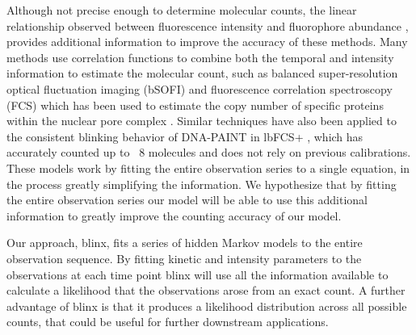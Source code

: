 Although not precise enough to determine molecular counts, the linear
relationship observed between fluorescence intensity and fluorophore abundance
\cite{schmied_fluorescence_2012}, provides additional information to improve the
accuracy of these methods.
%
  Many methods use correlation functions to combine both the temporal and
  intensity information to estimate the molecular count, such as balanced
  super-resolution optical fluctuation imaging (bSOFI) and fluorescence
  correlation spectroscopy (FCS) which has been used to estimate the copy
  number of specific proteins within the nuclear pore complex
  \cite{otsuka_quantitative_2023}. Similar techniques have also been applied to the
  consistent blinking behavior of DNA-PAINT in lbFCS+ \cite{stein_calibration-free_2021}, which has
  accurately counted up to ~8 molecules and does not rely on previous
  calibrations. These models work by fitting the entire observation series to a
  single equation, in the process greatly simplifying the information. We
  hypothesize that by fitting the entire observation series our model will be
  able to use this additional information to greatly improve the counting
  accuracy of our model.

Our approach, blinx, fits a series of hidden Markov models to the entire
observation sequence.
%
  By fitting kinetic and intensity parameters to the observations at each time
  point blinx will use all the information available to calculate a
  likelihood that the observations arose from an exact count. A further
  advantage of blinx is that it produces a likelihood distribution across
  all possible counts, that could be useful for further downstream
  applications.
